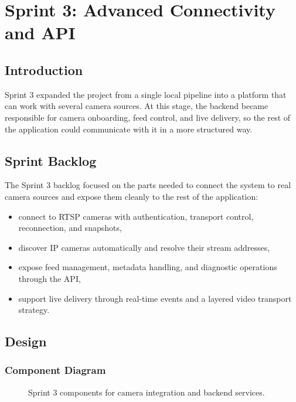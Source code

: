 \chapter{Sprint 3: Advanced Connectivity and API}
\chaptertoc

\clearpage

\section{Introduction}
Sprint 3 expanded the project from a single local pipeline into a platform that can work with several camera sources. At this stage, the backend became responsible for camera onboarding, feed control, and live delivery, so the rest of the application could communicate with it in a more structured way.

\section{Sprint Backlog}
The Sprint 3 backlog focused on the parts needed to connect the system to real camera sources and expose them cleanly to the rest of the application:
\begin{itemize}
    \item connect to RTSP cameras with authentication, transport control, reconnection, and snapshots,
    \item discover IP cameras automatically and resolve their stream addresses,
    \item expose feed management, metadata handling, and diagnostic operations through the API,
    \item support live delivery through real-time events and a layered video transport strategy.
\end{itemize}

\section{Design}

\subsection{Component Diagram}
\begin{figure}[H]
    \centering
    \caption{Sprint 3 components for camera integration and backend services.}
    \label{fig:sprint3_component}
\end{figure}


